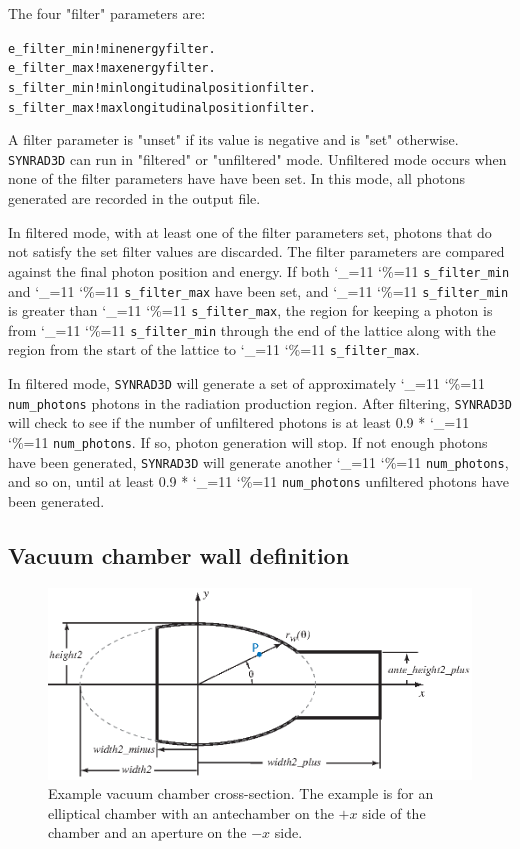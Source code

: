 \documentclass[11pt]{article}
\newcommand{\srthree}{\texttt{SYNRAD3D}\xspace}
\newcommand\ttcmd{\begingroup\catcode`\_=11 \catcode`\%=11 \dottcmd}
\newcommand\dottcmd[1]{\texttt{#1}\endgroup}
\newcommand{\vn}{\ttcmd}
\newlength{\ExBeg}
\newlength{\ExEnd}
\newenvironment{example}
  {\vspace{\ExBeg} \begin{alltt}}
  {\end{alltt} \vspace{\ExEnd}}
\begin{document}
The four "filter" parameters are:
\begin{example}
  e_filter_min   ! min energy filter.
  e_filter_max   ! max energy filter.
  s_filter_min   ! min longitudinal position filter.
  s_filter_max   ! max longitudinal position filter.
\end{example}
A filter parameter is "unset" if its value is negative and is "set"
otherwise.  \srthree can run in "filtered" or "unfiltered"
mode. Unfiltered mode occurs when none of the filter parameters have
have been set. In this mode, all photons generated are recorded in
the output file.

In filtered mode, with at least one of the filter parameters set,
photons that do not satisfy the set filter values are discarded. The
filter parameters are compared against the final photon position and
energy. If both \vn{s_filter_min} and \vn{s_filter_max} have been set,
and \vn{s_filter_min} is greater than \vn{s_filter_max}, the region
for keeping a photon is from \vn{s_filter_min} through the end of the
lattice along with the region from the start of the lattice to
\vn{s_filter_max}. 

In filtered mode, \srthree will generate a set of approximately
\vn{num_photons} photons in the radiation production region.  After
filtering, \srthree will check to see if the number of unfiltered
photons is at least 0.9 * \vn{num_photons}. If so, photon generation
will stop. If not enough photons have been generated, \srthree will
generate another \vn{num_photons}, and so on, until at least 0.9 *
\vn{num_photons} unfiltered photons have been generated. 

\subsection{Vacuum chamber wall definition} 

\begin{figure}[tb]
\begin{center}
\includegraphics[width=5in]{chamber.eps}
\caption{Example vacuum chamber cross-section. The example is for an elliptical
chamber with an antechamber on the $+x$ side of the chamber and an
aperture on the $-x$ side.}
\label{f.chamber}
\end{center}
\end{figure}
\end{document}
